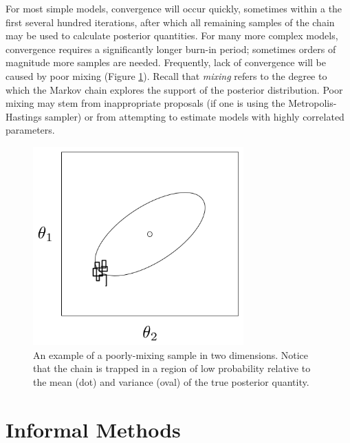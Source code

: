 \documentclass[]{book}
\begin{document}
For most simple models, convergence will occur quickly, sometimes within a the first several hundred iterations, after which all remaining samples of the chain may be used to calculate posterior quantities. For many more complex models, convergence requires a significantly longer burn-in period; sometimes  orders of magnitude more samples are needed. Frequently, lack of convergence will be caused by poor mixing (Figure \ref{fig:mix}). Recall that \emph{mixing} refers to the degree to which the Markov chain explores the support of the posterior distribution. Poor mixing may stem from inappropriate proposals (if one is using the Metropolis-Hastings sampler) or from attempting to estimate models with highly correlated parameters.

\begin{figure}[ht]
\begin{center}
\includegraphics[height=3in]{poor_mixing.png}
\caption{An example of a poorly-mixing sample in two dimensions. Notice that the chain is trapped in a region of low probability relative to the mean (dot) and variance (oval) of the true posterior quantity.}
\label{fig:mix}
\end{center}
\end{figure}

\section*{Informal Methods}
\end{document}
